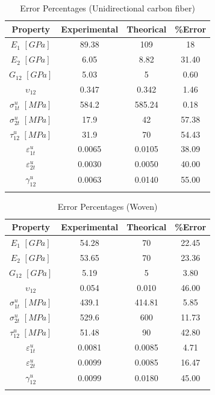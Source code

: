 \begin{table}[H]
\caption{Error Percentages (Unidirectional carbon fiber) \cite{pcl} \cite{navarro}  }  %
\label{tab:4}       %
\begin{center}
\begin{tabular}{cccc}
\hline\noalign{\smallskip}
Property & Experimental & Theorical & {\%}Error  \\
\hline\noalign{\smallskip}\hline\noalign{\smallskip}
$E_1$ $[GPa]$& 89.38 & 109 & 18 \\
$E_2$ $[GPa]$& 6.05 & 8.82 & 31.40 \\
$G_{12}$ $[GPa]$& 5.03 & 5 & 0.60 \\
$\upsilon_{12}$& 0.347 & 0.342 & 1.46\\
$\sigma_{1t}^u$ $[MPa]$& 584.2 & 585.24 & 0.18\\
$\sigma_{2t}^u$ $[MPa]$& 17.9 & 42 & 57.38 \\
$\tau_{12}^u$ $[MPa]$& 31.9 & 70 & 54.43\\
$\varepsilon_{1t}^u$& 0.0065 & 0.0105 & 38.09\\
$\varepsilon_{2t}^u$& 0.0030 & 0.0050 & 40.00\\
$\gamma_{12}^u$& 0.0063 & 0.0140 & 55.00\\
\noalign{\smallskip}\hline
\end{tabular}
\end{center}
\end{table}


\begin{table}[H]
\caption{Error Percentages (Woven) \cite{pcl} \cite{navarro}}  %
\label{tab:5}       %
\begin{center}
\begin{tabular}{cccc}
\hline\noalign{\smallskip}
Property & Experimental & Theorical & {\%}Error  \\
\hline\noalign{\smallskip}\hline\noalign{\smallskip}
$E_1$ $[GPa]$& 54.28 & 70 & 22.45 \\
$E_2$ $[GPa]$& 53.65 & 70 & 23.36 \\
$G_{12}$ $[GPa]$& 5.19 & 5 & 3.80 \\
$\upsilon_{12}$& 0.054 & 0.010 & 46.00\\
$\sigma_{1t}^u$ $[MPa]$& 439.1 & 414.81 & 5.85\\
$\sigma_{2t}^u$ $[MPa]$& 529.6 & 600 & 11.73 \\
$\tau_{12}^u$ $[MPa]$& 51.48 & 90 & 42.80\\
$\varepsilon_{1t}^u$& 0.0081 & 0.0085 & 4.71\\
$\varepsilon_{2t}^u$& 0.0099 & 0.0085 & 16.47\\
$\gamma_{12}^u$& 0.0099 & 0.0180 & 45.00\\
\noalign{\smallskip}\hline
\end{tabular}
\end{center}
\end{table}\\


